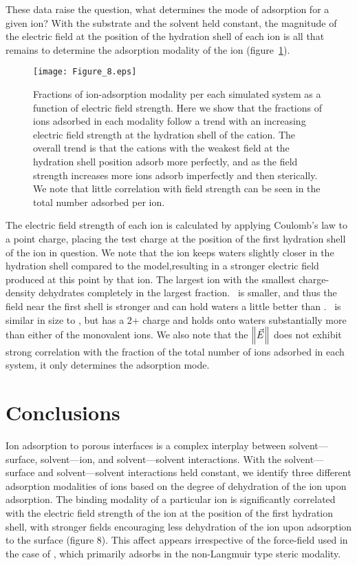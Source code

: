 These data raise the question, what determines the mode of adsorption for a given ion? 
With the substrate and the solvent held constant, the magnitude of the electric field at the position of the hydration shell
of each ion is all that remains to determine the adsorption modality of the ion (figure~\ref{figch3:cationfrac}).
\begin{figure}[H]
    \caption[Fractions of ion-adsorption modalities]{Fractions of ion-adsorption modality per each simulated system as a function of electric field strength. Here we 
    show that the fractions of ions adsorbed in each modality follow a trend with an increasing electric field strength at the
    hydration shell of the cation. The overall trend is that the cations with the weakest field at the hydration shell position
    adsorb more perfectly, and as the field strength increases more ions adsorb imperfectly and then sterically. We note
    that little correlation with field strength can be seen in the total number adsorbed per ion.}
    \label{figch3:cationfrac}
    \texttt{[image: Figure\_8.eps]}
\end{figure}
The electric field strength of each ion is calculated by applying Coulomb's law to a point charge, placing the test charge at the 
position of the first hydration shell of the ion in question. We note that the \mgmbnbfix{} ion keeps waters slightly closer in the hydration shell
compared to the \mgmicro{} model{,}{resulting in} a stronger electric field 
produced at this point by that ion.
The largest ion with the smallest charge-density \na{} dehydrates completely in the largest fraction.\ \li{} is smaller, and thus the field near
the first shell is stronger and can hold waters a little better than \na{}.\ \mg{} is similar in size to \li{}, but has a 2+ charge and
holds onto waters substantially more than either of the monovalent ions.  
We also note that the $\left\lVert\vec{E}\right\rVert$ does not exhibit strong correlation with the fraction of the total number of ions adsorbed in each system, it
only determines the adsorption mode. 

\section{Conclusions}
Ion adsorption to porous interfaces is a complex interplay 
between solvent---surface, solvent---ion, and solvent---solvent
interactions. With the solvent---surface and solvent---solvent interactions 
held constant, we identify
three different adsorption modalities of ions based on the degree of 
dehydration of the ion upon adsorption. 
The binding modality of a particular ion is significantly correlated 
with the electric field strength of the ion
at the position of the first hydration shell, with stronger fields 
encouraging less dehydration of the ion upon
adsorption to the surface {(figure 8)}. This affect appears irrespective of the force-field 
used in the case
of \mg{}, which primarily adsorbs in the non-Langmuir type steric modality.


